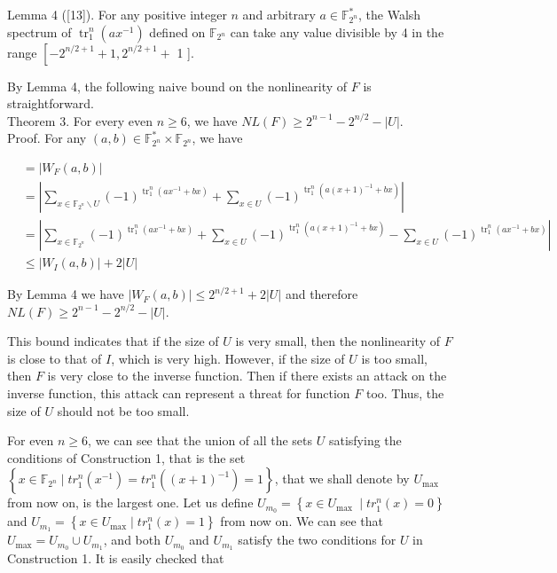 \documentclass[10pt]{article}
\begin{document}
Lemma 4 ([13]). For any positive integer $n$ and arbitrary $a \in \mathbb{F}_{2^{n}}^{*}$, the Walsh spectrum of $\operatorname{tr}_{1}^{n}\left(a x^{-1}\right)$ defined on $\mathbb{F}_{2^{n}}$ can take any value divisible by 4 in the range $\left[-2^{n / 2+1}+1,2^{n / 2+1}+\right.$ 1 ].

By Lemma 4, the following naive bound on the nonlinearity of $F$ is straightforward.\\
Theorem 3. For every even $n \geq 6$, we have $N L(F) \geq 2^{n-1}-2^{n / 2}-|U|$.\\
Proof. For any $(a, b) \in \mathbb{F}_{2^{n}}^{*} \times \mathbb{F}_{2^{n}}$, we have

$$
\begin{aligned}
& =\left|W_{F}(a, b)\right| \\
& =\left|\sum_{x \in \mathbb{F}_{2^{n}} \backslash U}(-1)^{\operatorname{tr}_{1}^{n}\left(a x^{-1}+b x\right)}+\sum_{x \in U}(-1)^{\operatorname{tr}_{1}^{n}\left(a(x+1)^{-1}+b x\right)}\right| \\
& =\left|\sum_{x \in \mathbb{F}_{2^{n}}}(-1)^{\operatorname{tr}_{1}^{n}\left(a x^{-1}+b x\right)}+\sum_{x \in U}(-1)^{\operatorname{tr}_{1}^{n}\left(a(x+1)^{-1}+b x\right)}-\sum_{x \in U}(-1)^{\operatorname{tr}_{1}^{n}\left(a x^{-1}+b x\right)}\right| \\
& \leq\left|W_{I}(a, b)\right|+2|U|
\end{aligned}
$$

By Lemma 4 we have $\left|W_{F}(a, b)\right| \leq 2^{n / 2+1}+2|U|$ and therefore $N L(F) \geq 2^{n-1}-2^{n / 2}- |U|$.

This bound indicates that if the size of $U$ is very small, then the nonlinearity of $F$ is close to that of $I$, which is very high. However, if the size of $U$ is too small, then $F$ is very close to the inverse function. Then if there exists an attack on the inverse function, this attack can represent a threat for function $F$ too. Thus, the size of $U$ should not be too small.

For even $n \geq 6$, we can see that the union of all the sets $U$ satisfying the conditions of Construction 1, that is the set $\left\{x \in \mathbb{F}_{2^{n}} \mid t r_{1}^{n}\left(x^{-1}\right)=t r_{1}^{n}\left((x+1)^{-1}\right)=1\right\}$, that we shall denote by $U_{\text {max }}$ from now on, is the largest one. Let us define $U_{m_{0}}=\left\{x \in U_{\text {max }} \mid t r_{1}^{n}(x)=0\right\}$ and $U_{m_{1}}=\left\{x \in U_{\max } \mid t r_{1}^{n}(x)=1\right\}$ from now on. We can see that $U_{\max }=U_{m_{0}} \cup U_{m_{1}}$, and both $U_{m_{0}}$ and $U_{m_{1}}$ satisfy the two conditions for $U$ in Construction 1. It is easily checked that
\end{document}
